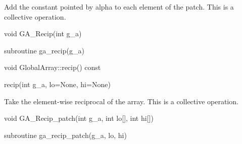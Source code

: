 \documentclass[12pt]{article}
\begin{document}
\begin{desc}

Add the constant pointed by alpha to each element of the patch.
This is a collective operation.
\end{desc}


\begin{capi}
\begin{ccode}
void GA_Recip(int g_a)
\end{ccode}
\begin{funcargs}
\end{funcargs}
\end{capi}

\begin{fapi}
\begin{fcode}
subroutine ga_recip(g_a)
\end{fcode}
\begin{funcargs}
\end{funcargs}
\end{fapi}

\begin{cxxapi}
\begin{cxxcode}
void GlobalArray::recip() const
\end{cxxcode}
\end{cxxapi}

\begin{pyapi}
\begin{pycode}
recip(int g_a, lo=None, hi=None) 
\end{pycode}
\end{pyapi}

\begin{desc}

Take the element-wise reciprocal of the array.
This is a collective operation.
\end{desc}


\begin{capi}
\begin{ccode}
void GA_Recip_patch(int g_a, int lo[], int hi[])
\end{ccode}
\begin{funcargs}
\end{funcargs}
\end{capi}

\begin{fapi}
\begin{fcode}
subroutine ga_recip_patch(g_a, lo, hi)
\end{fcode}
\begin{funcargs}
\end{funcargs}
\end{fapi}
\end{document}
